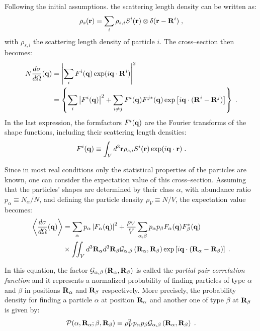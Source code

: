 Following the initial assumptions. the scattering length density can be written as:
\begin{equation*}
\rho_s(\mathbf{r}) = \sum_i \rho_{s,i} S^i(\mathbf{r}) \otimes \delta (\mathbf{r}-\mathbf{R}^i) \; ,
\end{equation*}
with $\rho_{s,i}$ the scattering length density of particle $i$. The cross--section then becomes:
\begin{align*}
  N\frac{d\sigma}{d\Omega}(\mathbf{q}) & = \left\lvert \sum_i F^i(\mathbf{q}) \exp (i\mathbf{q}\cdot\mathbf{R}^i) \right\rvert ^2  \\
  & = \left\lbrace \sum_i \left\lvert F^i(\mathbf{q}) \right\rvert ^2 + \sum_{i\neq j} F^i(\mathbf{q}) F^{j*}(\mathbf{q}) \exp \left[i\mathbf{q}\cdot (\mathbf{R}^i-\mathbf{R}^j)\right] \right\rbrace \; .
\end{align*}
In the last expression, the formfactors $F^i(\mathbf{q})$ are the Fourier transforms of the shape functions, including their scattering length densities:
\begin{equation*}
  F^i(\mathbf{q}) \equiv \int_V d^3\mathbf{r} \rho_{s,i} S^i(\mathbf{r}) \exp (i\mathbf{q}\cdot\mathbf{r} ) \; .
\end{equation*}


Since in most real conditions only the statistical properties of the particles are known, one can consider the expectation value of this cross--section. Assuming that the particles' shapes are determined by their class $\alpha$, with abundance ratio $p_\alpha \equiv N_\alpha / N$, and defining the particle density $\rho_V \equiv N/V$, the expectation value becomes:
\begin{align*}
  \left\langle \frac{d\sigma}{d\Omega}(\mathbf{q}) \right\rangle  & = \sum_\alpha p_\alpha \left\lvert F_\alpha(\mathbf{q})\right\rvert ^2 + \frac{\rho_V}{V}\sum_{\alpha,\beta} p_\alpha p_\beta F_\alpha (\mathbf{q})F_\beta^*(\mathbf{q})  \\
  & \times \iint_V d^3\mathbf{R}_\alpha d^3\mathbf{R}_\beta \mathcal{G}_{\alpha ,\beta}\left( \mathbf{R}_{\alpha} , \mathbf{R}_{\beta} \right) \exp \left[ i\mathbf{q}\cdot (\mathbf{R}_\alpha - \mathbf{R}_\beta ) \right] \; .
\end{align*}

In this equation, the factor $\mathcal{G}_{\alpha ,\beta}\left( \mathbf{R}_{\alpha} , \mathbf{R}_{\beta} \right)$ is called the \emph{partial pair correlation function} and it represents a normalized probability of finding particles of type $\alpha$ and $\beta$ in positions $\mathbf{R}_\alpha$ and $\mathbf{R}_\beta$ respectively. More precisely, the probability density for finding a particle $\alpha$ at position $\mathbf{R}_\alpha$ and another one of type $\beta$ at $\mathbf{R}_\beta$ is given by:
\begin{equation*}
  \mathcal{P}(\alpha, \mathbf{R}_\alpha ; \beta , \mathbf{R}_\beta ) \equiv \rho_V^2 p_\alpha p_\beta \mathcal{G}_{\alpha ,\beta}\left( \mathbf{R}_{\alpha} , \mathbf{R}_{\beta} \right) \; .
\end{equation*}

